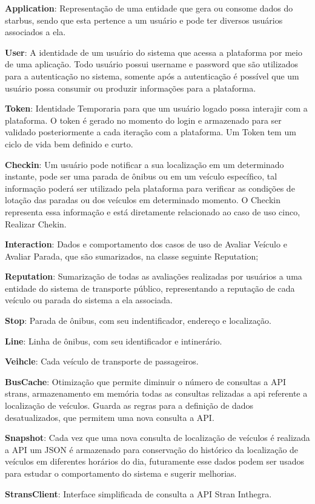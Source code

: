 \begin{lista}
  \item \textbf{Application}: Representação de uma entidade que gera ou consome dados do starbus, sendo
  que esta pertence a um usuário e pode ter diversos usuários associados a ela. 
  \item \textbf{User}: A identidade de um usuário do sistema que acessa a plataforma por 
  meio de uma aplicação. Todo usuário possui  username e password que são utilizados para a autenticação no sistema, 
  somente após a autenticação é possível que um usuário possa consumir ou produzir informações para a plataforma.
  \item \textbf{Token}: Identidade Temporaria para que um usuário logado possa interajir com a plataforma. O token é 
  gerado no momento do login e armazenado para ser validado posteriormente a cada iteração com a plataforma. 
  Um Token tem um ciclo de vida bem definido e curto.
  \item \textbf{Checkin}: Um usuário pode notificar a sua localização em um determinado instante, pode ser uma parada 
  de ônibus ou em um veículo específico, tal informação poderá ser utilizado pela plataforma para verificar as condições
  de lotação das paradas ou dos veículos em determinado momento. O Checkin representa essa informação e está diretamente
  relacionado ao caso de uso cinco, Realizar Chekin.
  \item \textbf{Interaction}: Dados e comportamento dos casos de uso de Avaliar Veículo e Avaliar Parada, que são 
  sumarizados, na classe seguinte Reputation;
  \item \textbf{Reputation}: Sumarização de todas as avaliações realizadas por usuários a uma entidade do sistema de 
  transporte público, representando a reputação de cada veículo ou parada do sistema a ela associada.
  \item \textbf{Stop}: Parada de ônibus, com seu indentificador, endereço e localização.
  \item \textbf{Line}: Linha de ônibus, com seu identificador e intinerário. 
  \item \textbf{Veihcle}: Cada veículo de transporte de passageiros.
  \item \textbf{BusCache}: Otimização que permite diminuir o número de consultas a API strans, armazenamento em memória 
   todas as consultas relizadas a api referente a localização de veículos. Guarda as regras para a definição de dados 
   desatualizados, que permitem uma nova consulta a API.   
  \item \textbf{Snapshot}: Cada vez que uma nova consulta de localização de veículos é realizada a API um JSON é armazenado 
  para conservação do histórico da localização de veículos em diferentes horários do dia, futuramente esse dados podem ser 
  usados para estudar o comportamento do sistema e sugerir melhorias. 
  \item \textbf{StransClient}: Interface simplificada de consulta a API Stran Inthegra.
\end{lista}

